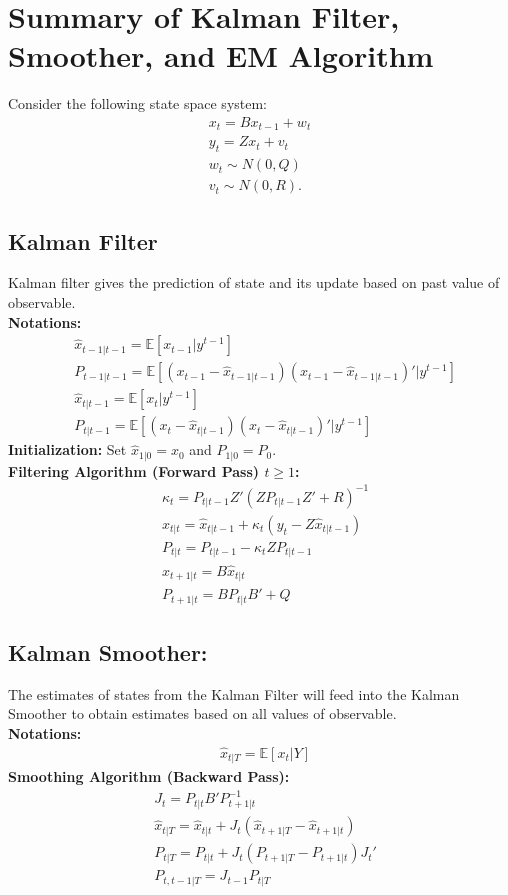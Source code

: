 \documentclass[12pt]{article}
\begin{document}
\section*{Summary of Kalman Filter, Smoother, and EM Algorithm}
Consider the following state space system:
\begin{gather*}
x_{t} = B x_{t-1} + w_{t}\\
y_t = Z x_t + v_t \\
w_t \sim N(0, Q) \\
v_t \sim N(0, R).
\end{gather*} 

\subsection{Kalman Filter}
Kalman filter gives the prediction of state and its update based on past value of observable. \\
\textbf{Notations:}
\begin{align*}
& \hat{x}_{t-1|t-1} = \mathbb{E}[x_{t-1}|y^{t-1}]\\
& P_{t-1|t-1} = \mathbb{E}[(x_{t-1}-\hat{x}_{t-1|t-1})(x_{t-1} - \hat{x}_{t-1|t-1})' |y^{t-1}]\\
& \hat{x}_{t|t-1} = \mathbb{E}[x_{t}|y^{t-1}]\\
& P_{t|t-1} = \mathbb{E}[(x_{t}-\hat{x}_{t|t-1})(x_{t} - \hat{x}_{t|t-1})' |y^{t-1}]
\end{align*}
\textbf{Initialization:}
Set $\hat{x}_{1|0} = x_0$ and $P_{1|0} = P_0$.\\
\textbf{Filtering Algorithm (Forward Pass) $t \geq 1$:}
\begin{align*}
& \kappa_t = P_{t|t-1}Z'(ZP_{t|t-1}Z' + R)^{-1}\\
& \hat{x}_{t|t} = \hat{x}_{t|t-1} + \kappa_t(y_t - Z\hat{x}_{t|t-1})\\
& P_{t|t} = P_{t|t-1} - \kappa_tZP_{t|t-1} \\
& \hat{x}_{t+1|t} = B \hat{x}_{t|t} \\
& P_{t+1|t} = BP_{t|t}B' + Q 
\end{align*}

\subsection{Kalman Smoother:}
The estimates of states from the Kalman Filter will feed into the Kalman Smoother to obtain estimates based on all values of observable.\\
\textbf{Notations:}
\begin{align*}
& \hat{x}_{t|T} = \mathbb{E}[x_{t}|Y]
\end{align*}
\textbf{Smoothing Algorithm (Backward Pass):}
\begin{align*}
& J_t = P_{t|t}B'P_{t+1|t}^{-1} \\
& \hat{x}_{t|T} = \hat{x}_{t|t} + J_t(\hat{x}_{t+1|T} - \hat{x}_{t+1|t})\\
& P_{t|T} = P_{t|t} + J_t(P_{t+1|T} - P_{t+1|t})J_t' \\
& P_{t, t-1|T} = J_{t-1}P_{t|T}
\end{align*}
\end{document}
